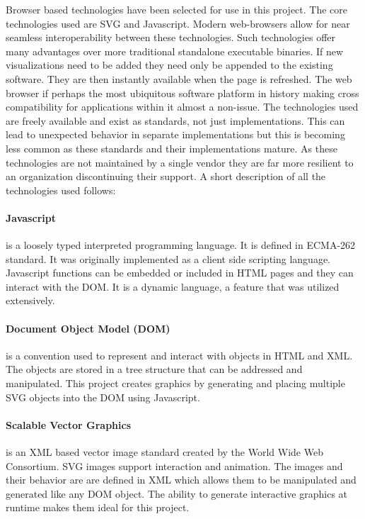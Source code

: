 \documentclass[a4paper, 11pt, titlepage, onehalfspacing]{report}
\begin{document}
Browser based technologies have been selected for use in this project. The core technologies used are SVG and Javascript. Modern web-browsers allow for near seamless interoperability between these technologies. Such technologies offer many advantages over more traditional standalone executable binaries. If new visualizations need to be added they need only be appended to the existing software. They are then instantly available when the page is refreshed. The web browser if perhaps the most ubiquitous software platform in history making cross compatibility for applications within it almost a non-issue. The technologies used are freely available and exist as standards, not just implementations. This can lead to unexpected behavior in separate implementations but this is becoming less common as these standards and their implementations mature. As these technologies are not maintained by a single vendor they are far more resilient to an organization discontinuing their support. A short description of all the technologies used follows:

\paragraph{Javascript}is a loosely typed interpreted programming language. It is defined in ECMA-262 standard. It was originally implemented as a client side scripting language. Javascript functions can be embedded or included in HTML pages and they can interact with the DOM. It is a dynamic language, a feature that was utilized extensively.

\paragraph{Document Object Model (DOM)}is a convention used to represent and interact with objects in HTML and XML. The objects are stored in a tree structure that can be addressed and manipulated. This project creates graphics by generating and placing multiple SVG objects into the DOM using Javascript.

\paragraph{Scalable Vector Graphics}is an XML based vector image standard created by the World Wide Web Consortium. SVG images support interaction and animation. The images and their behavior are are defined in XML which allows them to be manipulated and generated like any DOM object. The ability to generate interactive graphics at runtime makes them ideal for this project.
\end{document}
